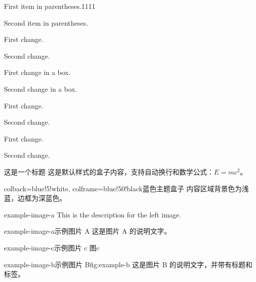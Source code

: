 \begin{kuohao}
	\item First item in parentheses.1111
	\item Second item in parentheses.
\end{kuohao}

\begin{change}
	\item First change.
	\item Second change.
\end{change}

\begin{change2}
	\item First change in a box.
	\item Second change in a box.
\end{change2}

\begin{changecircredtwo}
	\item First change.
	\item Second change.
\end{changecircredtwo}

\begin{changecicred}
	\item First change.
	\item Second change.
\end{changecicred}

\begin{basebox}{}{这是一个标题}
	这是默认样式的盒子内容，支持自动换行和数学公式：$E=mc^2$。
\end{basebox}

\begin{basebox}{colback=blue!5!white, colframe=blue!50!black}{蓝色主题盒子}
	内容区域背景色为浅蓝，边框为深蓝色。
\end{basebox}


\begin{leftimage}[0.4\textwidth]{example-image-a}
	This is the description for the left image.
\end{leftimage}

\begin{leftimage}[0.4\textwidth]{example-image-a}{示例图片 A}
	这是图片 A 的说明文字。
\end{leftimage}

\begin{lefttwoimage}[0.4\textwidth]{example-image-c}{示例图片 c}
	图c
\end{lefttwoimage}
\begin{leftimagewithcaption}[0.4\textwidth]{example-image-b}{示例图片 B}{fig:example-b}
	这是图片 B 的说明文字，并带有标题和标签。
\end{leftimagewithcaption}



